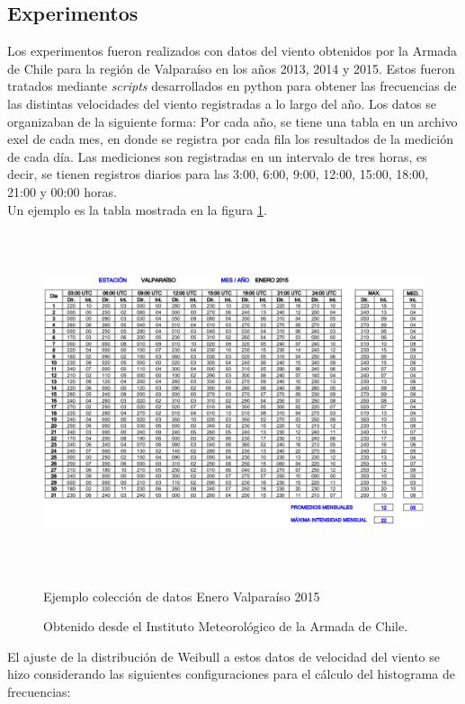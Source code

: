 \subsection{Experimentos}
Los experimentos fueron realizados con datos del viento obtenidos por la Armada de Chile para la región de Valparaíso en los años 2013, 2014 y 2015. Estos fueron tratados mediante \emph{scripts} desarrollados en python para obtener las frecuencias de las distintas velocidades del viento registradas a lo largo del año. Los datos se organizaban de la siguiente forma: Por cada año, se tiene una tabla en un archivo exel de cada mes, en donde se registra por cada fila los resultados de la medición de cada día. Las mediciones son registradas en un intervalo de tres horas, es decir, se tienen registros diarios para las 3:00, 6:00, 9:00, 12:00, 15:00, 18:00, 21:00 y 00:00 horas.\\
Un ejemplo es la tabla mostrada en la figura \ref{fig:example_data}.
 \begin{figure}[h!]
    \centering
    \includegraphics[height=100mm]{figures/example_data.png}
    \caption{Ejemplo colección de datos Enero Valparaíso 2015}
    \vspace{-.25cm}
    \caption*{Obtenido desde el Instituto Meteorológico de la Armada de Chile.}
    \label{fig:example_data}
 \end{figure}
El ajuste de la distribución de Weibull a estos datos de velocidad del viento se hizo considerando las siguientes configuraciones para el cálculo del
histograma de frecuencias:
